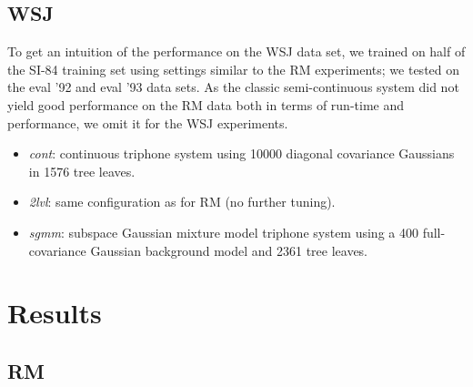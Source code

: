 \documentclass{article}
\begin{document}
\subsection{WSJ}
To get an intuition of the performance on the WSJ data set, we trained on 
half of the SI-84 training set using settings similar to the RM experiments; 
we tested on the eval '92 and eval '93 data sets.
As the classic semi-continuous system did not yield good performance on the
RM data both in terms of run-time and performance, we omit it for the WSJ
experiments.
%
\begin{itemize}
\item
  {\em cont}: continuous triphone system using 10000 diagonal covariance
  Gaussians in 1576 tree leaves.
\item
    {\em 2lvl}: same configuration as for RM (no further tuning).
\item
  {\em sgmm}: subspace Gaussian mixture model triphone system using a 400 
  full-covariance Gaussian background model and 2361 tree leaves.
\end{itemize}


\section{Results}

\subsection{RM}
\end{document}

